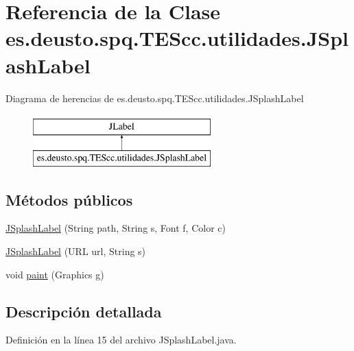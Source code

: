 \hypertarget{classes_1_1deusto_1_1spq_1_1_t_e_scc_1_1utilidades_1_1_j_splash_label}{\section{Referencia de la Clase es.\+deusto.\+spq.\+T\+E\+Scc.\+utilidades.\+J\+Splash\+Label}
\label{classes_1_1deusto_1_1spq_1_1_t_e_scc_1_1utilidades_1_1_j_splash_label}
}
Diagrama de herencias de es.\+deusto.\+spq.\+T\+E\+Scc.\+utilidades.\+J\+Splash\+Label\begin{figure}[H]
\begin{center}
\leavevmode
\includegraphics[height=2.000000cm]{classes_1_1deusto_1_1spq_1_1_t_e_scc_1_1utilidades_1_1_j_splash_label}
\end{center}
\end{figure}
\subsection*{Métodos públicos}
\begin{DoxyCompactItemize}
\item 
\hyperlink{classes_1_1deusto_1_1spq_1_1_t_e_scc_1_1utilidades_1_1_j_splash_label_aac19716284f0994f725dfd9999d7a5cc}{J\+Splash\+Label} (String path, String s, Font f, Color c)
\item 
\hyperlink{classes_1_1deusto_1_1spq_1_1_t_e_scc_1_1utilidades_1_1_j_splash_label_a2ddd9035e9bc35afa0252bf1fb71ef1c}{J\+Splash\+Label} (U\+R\+L url, String s)
\item 
void \hyperlink{classes_1_1deusto_1_1spq_1_1_t_e_scc_1_1utilidades_1_1_j_splash_label_ad4c20dc8708d554e0e1c181b026f94db}{paint} (Graphics g)
\end{DoxyCompactItemize}


\subsection{Descripción detallada}


Definición en la línea 15 del archivo J\+Splash\+Label.\+java.



